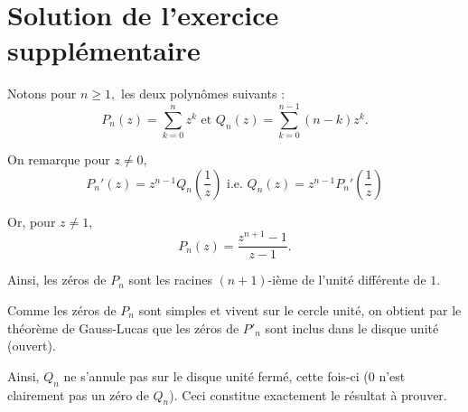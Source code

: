 \section{Solution de l'exercice supplémentaire}

Notons pour $n\geq 1,$ les deux polynômes suivants : $$P_{n}(z)=\sum_{k=0}^{n}z^{k} \mbox{ et } Q_{n}(z)=\sum_{k=0}^{n-1}(n-k)z^{k}.$$

On remarque pour $z\neq 0,$ $$P_{n}'(z)=z^{n-1}Q_{n}(\frac{1}{z}) \mbox{ i.e. } Q_{n}(z)=z^{n-1}P_{n}'(\frac{1}{z}) $$

Or, pour $z\neq 1,$ $$P_{n}(z)=\frac{z^{n+1}-1}{z-1}.$$ 

Ainsi, les zéros de $P_{n}$ sont les racines $(n+1)$-ième de l'unité différente de $1.$

Comme les zéros de $P_{n}$ sont simples et vivent sur le cercle unité, on obtient par le théorème de Gauss-Lucas que les zéros de $P'_{n}$ sont inclus dans le disque unité (ouvert).

Ainsi, $Q_{n}$ ne s'annule pas sur le disque unité fermé, cette fois-ci ($0$ n'est clairement pas un zéro de $Q_{n}$). Ceci constitue exactement le résultat à prouver.
